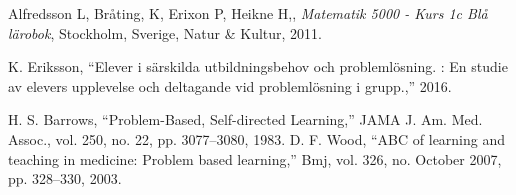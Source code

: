      Alfredsson L, Bråting, K, Erixon P, Heikne H,, \textit{Matematik 5000 - Kurs 1c Blå lärobok}, Stockholm, Sverige, Natur \& Kultur, 2011.
     
     K. Eriksson, “Elever i särskilda utbildningsbehov och problemlösning. : En studie av elevers upplevelse och deltagande vid problemlösning i grupp.,” 2016.
     
      H. S. Barrows, “Problem-Based, Self-directed Learning,” JAMA J. Am. Med. Assoc., vol. 250, no. 22, pp. 3077–3080, 1983.
    D. F. Wood, “ABC of learning and teaching in medicine: Problem based learning,” Bmj, vol. 326, no. October 2007, pp. 328–330, 2003.